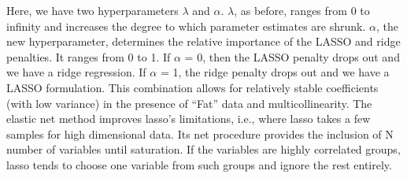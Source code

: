 \documentclass[12pt,italian, twoside]{report}
\begin{document}
\begin{enumerate}
\begin{equation}
	\label{eq:EN}
\end{equation}
Here, we have two hyperparameters $\lambda$ and $\alpha$. $\lambda$, as before, ranges from 0 to infinity and increases the degree to which parameter estimates are shrunk. $\alpha$, the new hyperparameter, determines the relative importance of the LASSO and ridge penalties. It ranges from 0 to 1. If $\alpha$ = 0, then the LASSO penalty drops out and we have a ridge regression. If $\alpha$ = 1, the ridge penalty drops out and we have a LASSO formulation. This combination allows for relatively stable coefficients (with low variance) in the presence of “Fat” data and multicollinearity. The elastic net method improves lasso’s limitations, i.e., where lasso takes a few samples for high dimensional data. Its net procedure provides the inclusion of N number of variables until saturation. If the variables are highly correlated groups, lasso tends to choose one variable from such groups and ignore the rest entirely.


\end{enumerate}
\end{document}

